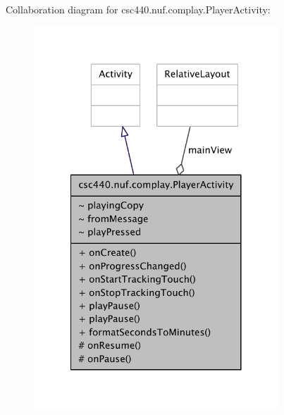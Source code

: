 Collaboration diagram for csc440.\-nuf.\-complay.\-Player\-Activity\-:
\nopagebreak
\begin{figure}[H]
\begin{center}
\leavevmode
\includegraphics[width=260pt]{classcsc440_1_1nuf_1_1complay_1_1_player_activity__coll__graph}
\end{center}
\end{figure}
